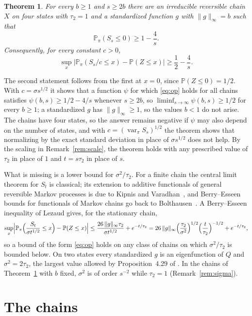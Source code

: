 \documentclass[11pt]{amsart}
\newtheorem{theorem}{Theorem}
\theoremstyle{remark}
\numberwithin{equation}{section}
\newcommand{\Pp}{\mathbb P}
\DeclareMathOperator{\var}{var}
\begin{document}
\begin{theorem}\label{thm:main}
For every $b\ge1$ and $s\ge2b$ there are an irreducible reversible chain $X$ on four states with $\tau_2=1$ and a standardized function $g$ with $\|g\|_\infty=b$ such that
\[
\Pp_\pi(S_s\le0)\ge1-\frac4s .
\]
Consequently, for every constant $c>0$,
\[
\sup_x\bigl|\Pp_\pi(S_s/c\le x)-\Pp(Z\le x)\bigr|\ge\frac12-\frac4s .
\]
\end{theorem}

The second statement follows from the first at $x=0$, since $\Pp(Z\le0)=1/2$. With $c=\sigma s^{1/2}$ it shows that a function $\psi$ for which \eqref{eq:op} holds for all chains satisfies $\psi(b,s)\ge1/2-4/s$ whenever $s\ge2b$, so $\liminf_{s\to\infty}\psi(b,s)\ge1/2$ for every $b\ge1$; a standardized $g$ has $\|g\|_\infty\ge1$, so the values $b<1$ do not arise. The chains have four states, so the answer remains negative if $\psi$ may also depend on the number of states, and with $c=(\var_\pi S_s)^{1/2}$ the theorem shows that normalizing by the exact standard deviation in place of $\sigma s^{1/2}$ does not help. By the scaling in Remark~\ref{rem:scale}, the theorem holds with any prescribed value of $\tau_2$ in place of $1$ and $t=s\tau_2$ in place of $s$.

What is missing is a lower bound for $\sigma^2/\tau_2$. For a finite chain the central limit theorem for $S_t$ is classical; its extension to additive functionals of general reversible Markov processes is due to Kipnis and Varadhan~\cite{KV86}, and Berry--Esseen bounds for functionals of Markov chains go back to Bolthausen~\cite{Bol80}. A Berry--Esseen inequality of Lezaud \cite[Theorem~3.1]{Lez01} gives, for the stationary chain,
\begin{equation}\label{eq:lezaud}
\sup_x\Bigl|\Pp_\pi\Bigl(\frac{S_t}{\sigma t^{1/2}}\le x\Bigr)-\Pp(Z\le x)\Bigr|\le\frac{26\,\|g\|_\infty\tau_2}{\sigma t^{1/2}}+e^{-t/\tau_2}
=26\,\|g\|_\infty\Bigl(\frac{\tau_2}{\sigma^2}\Bigr)^{1/2}\Bigl(\frac t{\tau_2}\Bigr)^{-1/2}+e^{-t/\tau_2},
\end{equation}
so a bound of the form \eqref{eq:op} holds on any class of chains on which $\sigma^2/\tau_2$ is bounded below. On two states every standardized $g$ is an eigenfunction of $Q$ and $\sigma^2=2\tau_2$, the largest value allowed by Proposition~4.29 of \cite{AF}. In the chains of Theorem~\ref{thm:main} with $b$ fixed, $\sigma^2$ is of order $s^{-2}$ while $\tau_2=1$ (Remark~\ref{rem:sigma}).

\section{The chains}\label{sec:chains}
\end{document}
